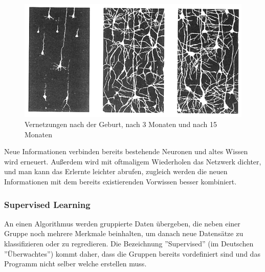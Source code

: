 \begin{figure}[H]
      \centering
      \includegraphics[scale=0.8]{sections/machine-learning/images/neuronale-netze.png}
      \caption{Vernetzungen nach der Geburt, nach 3 Monaten und nach 15 Monaten}
\end{figure}

Neue Informationen verbinden bereits bestehende Neuronen und altes Wissen wird erneuert. Außerdem wird mit oftmaligem Wiederholen das Netzwerk dichter, und man kann das Erlernte leichter abrufen, zugleich werden die neuen Informationen mit dem bereits existierenden Vorwissen besser kombiniert. \cite{LANP}

\subsubsection{Supervised Learning}

An einen Algorithmus werden gruppierte Daten übergeben, die neben einer Gruppe noch mehrere Merkmale beinhalten, um danach neue Datensätze zu klassifizieren oder zu regredieren. Die Bezeichnung ''Supervised'' (im Deutschen ''Überwachtes'') kommt daher, dass die Gruppen bereits vordefiniert sind und das Programm nicht selber welche erstellen muss. \cite{SL:online}

\begin{table}[H]
      \centering
      \caption{Beispiel für gruppierte Daten als Tabelle; Merkmale: Farbe, Form, Geschmack; Gruppe: Frucht}
      \label{tbl:fruit-data}
\end{table}

